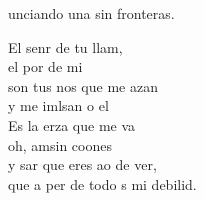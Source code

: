 \begin{cancion}
	unciando una sin fronteras.\jump\\
	\begin{chorus}%
		El senr de tu llam,\\
		el por de mi\\
		son tus nos que me azan\\
		y me imlsan o el \\
		Es la erza que me va\\
		oh,  amsin coones\\
		y sar que eres ao de ver,\\
		que a per de todo s mi debilid.\jump\\
	\end{chorus}%
	\jump
	\jump
\end{cancion}%

